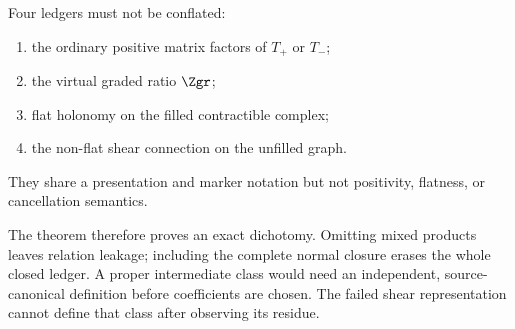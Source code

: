 Four ledgers must not be conflated:
\begin{enumerate}
  \item the ordinary positive matrix factors of $T_+$ or $T_-$;
  \item the virtual graded ratio $\Zgr$;
  \item flat holonomy on the filled contractible complex;
  \item the non-flat shear connection on the unfilled graph.
\end{enumerate}
They share a presentation and marker notation but not positivity, flatness, or
cancellation semantics.

The theorem therefore proves an exact dichotomy.  Omitting mixed products
leaves relation leakage; including the complete normal closure erases the
whole closed ledger.  A proper intermediate class would need an independent,
source-canonical definition before coefficients are chosen.  The failed shear
representation cannot define that class after observing its residue.
